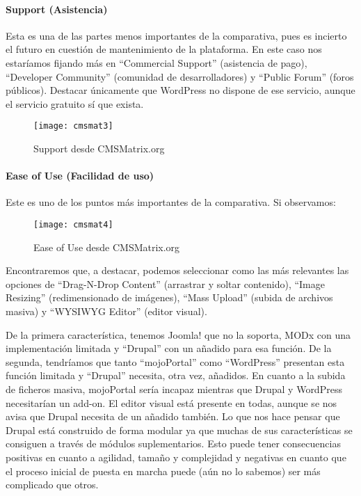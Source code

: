 \paragraph{Support (Asistencia)}

\par Esta es una de las partes menos importantes de la comparativa, pues es incierto el futuro en cuestión de mantenimiento de la plataforma. En este caso nos estaríamos fijando más en ``Commercial Support'' (asistencia de pago), ``Developer Community'' (comunidad de desarrolladores) y ``Public Forum'' (foros públicos). Destacar únicamente que WordPress no dispone de ese servicio, aunque el servicio gratuito sí que exista.

\begin{figure}
\begin{narrow}{-0.12\linewidth}{-0.12\linewidth}
\centering
\texttt{[image: cmsmat3]}
\caption{Support desde CMSMatrix.org}
\end{narrow}
\label{fig:cmsmat3}
\end{figure}

\paragraph{Ease of Use (Facilidad de uso)}

\par Este es uno de los puntos más importantes de la comparativa. Si observamos:

\begin{figure}
\begin{narrow}{-0.12\linewidth}{-0.12\linewidth}
\centering
\texttt{[image: cmsmat4]}
\caption{Ease of Use desde CMSMatrix.org}
\end{narrow}
\label{fig:cmsmat4}
\end{figure}

\par Encontraremos que, a destacar, podemos seleccionar como las más relevantes las opciones de ``Drag-N-Drop Content'' (arrastrar y soltar contenido), ``Image Resizing'' (redimensionado de imágenes), ``Mass Upload'' (subida de archivos masiva) y ``WYSIWYG Editor'' (editor visual).
\par De la primera característica, tenemos Joomla! que no la soporta, MODx con una implementación limitada y ``Drupal'' con un añadido para esa función. De la segunda, tendríamos que tanto ``mojoPortal'' como ``WordPress'' presentan esta función limitada y ``Drupal'' necesita, otra vez, añadidos. En cuanto a la subida de ficheros masiva, mojoPortal sería incapaz mientras que Drupal y WordPress necesitarían un add-on. El editor visual está presente en todas, aunque se nos avisa que Drupal necesita de un añadido también. Lo que nos hace pensar que Drupal está construido de forma modular ya que muchas de sus características se consiguen a través de módulos suplementarios. Esto puede tener consecuencias positivas en cuanto a agilidad, tamaño y complejidad y negativas en cuanto que el proceso inicial de puesta en marcha puede (aún no lo sabemos) ser más complicado que otros.



